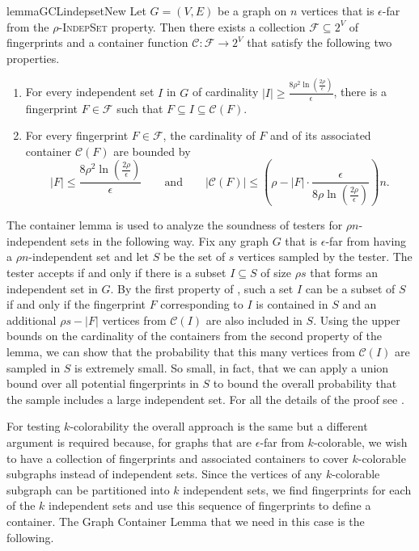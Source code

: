 \documentclass[11pt]{article}
\begin{document}
\begin{restatable}{lemma}{GCLindepsetNew}
\label{lem:GCL-indepsetNew} 
Let $G = (V,E)$ be a graph on $n$ vertices that is $\epsilon$-far from the \textsc{$\rho$-IndepSet} property.
Then there exists a collection $\mathcal{F} \subseteq 2^V$ of fingerprints and a container function $\mathcal{C} : \mathcal{F} \rightarrow 2^V$ that satisfy the following two properties.
\begin{enumerate}
\item For every independent set $I$ in $G$ of cardinality $|I| \geq \frac{8\rho^2 \ln(\frac{2\rho}{\epsilon})}{\epsilon}$, there is a fingerprint $F \in \mathcal{F}$ such that $F \subseteq I \subseteq \mathcal{C}(F)$.
\item For every fingerprint $F \in \mathcal{F}$, the cardinality of $F$ and of its associated container $\mathcal{C}(F)$ are bounded by 
\[
	|F| \leq \frac{8\rho^2 \ln(\frac{2\rho}{\epsilon})}{\epsilon} \qquad \mbox{and} \qquad |\mathcal{C}(F)| \leq \left( \rho - |F| \cdot \frac{\epsilon}{8 \rho \ln(\frac{2\rho}{\epsilon})} \right) n.
\]
\end{enumerate}
\end{restatable}

The container lemma is used to analyze the soundness of testers for $\rho n$-independent sets in the following way. 
Fix any graph $G$ that is $\epsilon$-far from having a $\rho n$-independent set and 
let $S$ be the set of $s$ vertices sampled by the tester.
The tester accepts if and only if there is a subset $I \subseteq S$ of size $\rho s$ that forms an independent set in $G$.
By the first property of , such a set $I$ can be a subset of $S$ if and only if the fingerprint $F$ corresponding to $I$ is contained in $S$ and an additional $\rho s - |F|$ vertices from $\mathcal{C}(I)$ are also included in $S$.
Using the upper bounds on the cardinality of the containers from the second property of the lemma, we can show that the probability that this many vertices from $\mathcal{C}(I)$ are sampled in $S$ is extremely small.
So small, in fact, that we can apply a union bound over all potential fingerprints in $S$ to bound the overall probability that the sample includes a large independent set.
For all the details of the proof see .

For testing $k$-colorability the overall approach is the same but a different argument is required because, for graphs that are $\epsilon$-far from $k$-colorable, we wish to have a collection of fingerprints and associated containers to cover $k$-colorable subgraphs instead of independent sets.
Since the vertices of any $k$-colorable subgraph can be partitioned into $k$ independent sets, we find fingerprints for each of the $k$ independent sets and use this sequence of fingerprints to define a container.
The Graph Container Lemma that we need in this case is the following.
\end{document}
